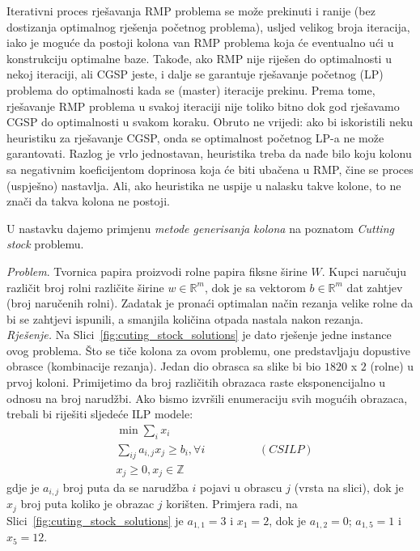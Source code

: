 \documentclass[a4paper, utf8, 11pt, colorlinks]{book}
\begin{document}
Iterativni proces rješavanja RMP problema se može prekinuti i ranije (bez dostizanja optimalnog rješenja početnog problema), usljed velikog broja iteracija,  iako je moguće da postoji kolona van RMP problema koja će eventualno ući u konstrukciju optimalne baze.  Takođe, ako RMP nije riješen do optimalnosti u nekoj iteraciji, ali CGSP jeste, i dalje se garantuje rješavanje početnog (LP) problema do optimalnosti kada se (master) iteracije prekinu. Prema tome, rješavanje RMP problema u svakoj iteraciji nije toliko bitno dok god rješavamo CGSP do optimalnosti u svakom koraku. Obruto ne vrijedi:   ako bi iskoristili neku heuristiku za rješavanje CGSP, onda se optimalnost početnog LP-a ne može garantovati. Razlog je vrlo jednostavan, heuristika treba da nađe bilo koju kolonu sa negativnim koeficijentom doprinosa koja će biti ubačena u RMP, čine se proces (uspješno) nastavlja. Ali, ako heuristika ne uspije u nalasku takve kolone, to ne znači da takva kolona ne postoji. 


 U nastavku dajemo primjenu \emph{metode generisanja kolona} na poznatom \emph{Cutting stock} problemu. 
 
 \emph{Problem}. Tvornica papira proizvodi rolne papira fiksne širine  $W$. 
 Kupci naručuju različit broj rolni različite širine $w \in \mathbb{R}^m$, dok je sa vektorom $b \in \mathbb{R}^m$ dat zahtjev (broj naručenih rolni).  Zadatak je pronaći optimalan način  rezanja velike rolne da bi se zahtjevi ispunili, a smanjila količina otpada nastala nakon rezanja.  \\ 
 
 \emph{Rješenje.} Na Slici~\ref{fig:cuting_stock_solutions} je dato rješenje jedne instance ovog problema. 
 Što se tiče kolona za ovom problemu, one predstavljaju dopustive obrasce (kombinacije rezanja). Jedan dio obrasca sa slike bi bio $1820$ x $2$ (rolne) u prvoj koloni.
 Primijetimo da broj različitih obrazaca raste eksponencijalno u odnosu na broj narudžbi.  Ako bismo izvršili enumeraciju svih mogućih obrazaca, trebali bi riješiti sljedeće ILP modele:
 \begin{align*}
      & \min \sum_{i} x_i \\
      & \sum_{ij} a_{i,j }x_j \geq b_i, \forall i \hspace{2cm} (CSILP)\\
      &  x_j \geq 0, x_{j} \in \mathbb{Z} 
 \end{align*}
 gdje je $a_{i,j}$ broj puta da se narudžba $i$ pojavi u obrascu $j$ (vrsta na slici), dok  je $x_j$ broj puta koliko je obrazac $j$ korišten. Primjera radi, na  Slici~\ref{fig:cuting_stock_solutions} je $a_{1,1}=3$ i $x_1 = 2$, dok je $a_{1,2}=0$; $a_{1,5}=1$ i $ x_5 = 12$.
 
\end{document}
